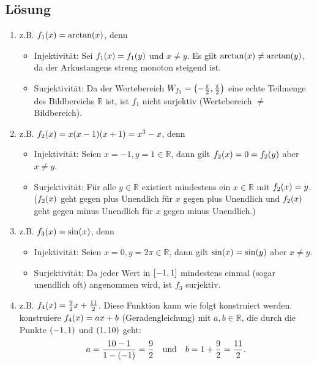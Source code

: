 \documentclass[german,12pt]{homework}
\newcommand{\RR}{\mathbb{R}}
\DeclarePairedDelimiter{\enbrace}{(}{)}
\DeclarePairedDelimiter{\benbrace}{[}{]}
\begin{document}
    \subsection*{Lösung}
    \begin{enumerate}
        \item z.B. \(f_1\enbrace*{x} = \arctan\enbrace*{x}\), denn
        \begin{itemize}
            \item Injektivität: Sei \(f_1\enbrace*{x} = f_1\enbrace*{y}\) und
            \(x \ne y\). Es gilt \(\arctan\enbrace*{x} \ne
            \arctan\enbrace*{y}\), da der Arkustangens streng monoton steigend
            ist.
            \item Surjektivität: Da der Wertebereich \(W_{f_1} = \enbrace*{-
            \frac{\pi}{2}, \frac{\pi}{2}}\) eine echte Teilmenge des
            Bildbereichs \(\RR\) ist, ist \(f_1\) nicht surjektiv (Wertebereich
            \(\ne\) Bildbereich).
        \end{itemize}
        \item z.B. \(f_2\enbrace*{x} = x\enbrace*{x - 1}\enbrace*{x + 1} = x^3
        - x\), denn
        \begin{itemize}
            \item Injektivität: Seien \(x = -1, y = 1 \in \RR\), dann gilt
            \(f_2\enbrace*{x} = 0 = f_2\enbrace*{y}\) aber \(x \ne y\).
            \item Surjektivität: Für alle \(y \in \RR\) existiert mindestens
            ein \(x \in \RR\) mit \(f_2\enbrace*{x} = y\). (\(f_2\enbrace*{x}\)
            geht gegen plus Unendlich für \(x\) gegen plus Unendlich und
            \(f_2\enbrace*{x}\) geht gegen minus Unendlich für \(x\) gegen
            minus Unendlich.)
        \end{itemize}
        \item z.B. \(f_3\enbrace*{x} = \sin\enbrace*{x}\), denn
        \begin{itemize}
            \item Injektivität: Seien \(x = 0, y = 2\pi \in \RR\), dann gilt
            \(\sin\enbrace*{x} = \sin\enbrace*{y}\) aber \(x \ne y\).
            \item Surjektivität: Da jeder Wert in \(\benbrace*{-1, 1}\)
            mindestens einmal (sogar unendlich oft) angenommen wird, ist
            \(f_3\) surjektiv.
        \end{itemize}
        \item z.B. \(f_4\enbrace*{x} = \frac{9}{2}x + \frac{11}{2}\). Diese
        Funktion kann wie folgt konstruiert werden. konstruiere
        \(f_4\enbrace*{x} = ax + b\) (Geradengleichung) mit \(a, b \in \RR\),
        die durch die Punkte \(\enbrace*{-1, 1}\) und \(\enbrace*{1, 10}\) geht:
        \[a = \frac{10 - 1}{1 - \enbrace*{-1}} = \frac{9}{2} \quad \text{und}
        \quad b = 1 + \frac{9}{2} = \frac{11}{2}.\]
    \end{enumerate}
\end{document}
